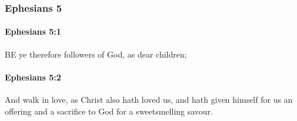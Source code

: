 	\subsubsection{Ephesians 5} %
		\label{EPHESIANS-5}
		
		\paragraph{Ephesians 5:1} %
			\label{EPHESIANS-5-1}

			BE ye therefore followers of God, as dear children;

			\begin{framed}
			\scriptsize
				\begin{compactdesc}
					\item[SBLG] 
				\end{compactdesc}
			\end{framed}

		\paragraph{Ephesians 5:2} %
			\label{EPHESIANS-5-2}

			And walk in love, as Christ also hath loved us, and hath given himself for us an offering and a sacrifice to God for a sweetsmelling savour.

